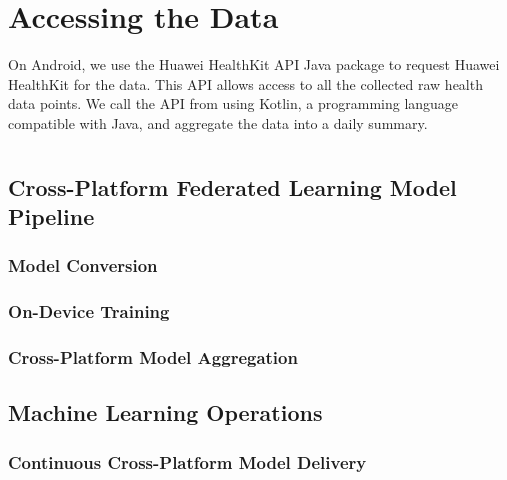 \section{Accessing the Data}

On Android, we use the Huawei HealthKit API Java package to request
Huawei HealthKit for the data.
This API allows access to all the collected raw health data points.
We call the API from using Kotlin,
a programming language compatible with Java,
and aggregate the data into a daily summary.

\section{\fedkit}

\subsection{Cross-Platform Federated Learning Model Pipeline}

\subsubsection{Model Conversion}

\subsubsection{On-Device Training}

\subsubsection{Cross-Platform Model Aggregation}

\subsection{Machine Learning Operations}

\subsubsection{Continuous Cross-Platform Model Delivery}

